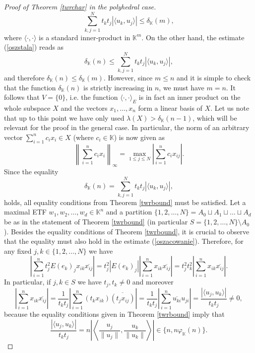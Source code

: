 \documentclass[12pt, reqno]{amsart}
\theoremstyle{definition}
\theoremstyle{remark}
\numberwithin{equation}{section}
\begin{document}
\begin{proof}[Proof of Theorem \ref{twrchar} in the polyhedral case]
$$\sum_{k, j=1}^N t_k t_j | \langle u_k,  u_j\rangle| \leq \delta_{\mathbb{K}}(m),$$
where $\langle \cdot, \cdot \rangle$ is a standard inner-product in $\mathbb{K}^m$. On the other hand, the estimate (\ref{oszstala}) reads as
$$\delta_{\mathbb{K}}(n) \leq \sum_{k, j=1}^N t_k t_j | \langle u_k,  u_j\rangle|,$$
and therefore $\delta_{\mathbb{K}}(n) \leq \delta_{\mathbb{K}}(m)$. However, since $m \leq n$ and it is simple to check that the function $\delta_{\mathbb{K}}(n)$ is strictly increasing in $n$, we must have $m=n$. It follows that $V = \{0\}$, i.e. the function $\langle \cdot, \cdot \rangle_E$ is in fact an inner product on the whole subspace $X$ and the vectors $x_1, \ldots, x_n$ form a linear basis of $X$. Let us note that up to this point we have only used $\lambda(X)>\delta_{\mathbb{K}}(n-1)$, which will be relevant for the proof in the general case. In particular, the norm of an arbitrary vector $\sum_{i=1}^{n} c_ix_i \in X$ (where $c_i \in \mathbb{K}$) is now given as
\begin{equation}
\label{norma}
\left \| \sum_{i=1}^{n} c_ix_i \right \|_{\infty} = \max_{1 \leq j \leq N} \left | \sum_{i=1}^{n} c_ix_{ij} \right |.
\end{equation}
Since the equality
$$\delta_{\mathbb{K}}(n) = \sum_{k, j=1}^N t_k t_j | \langle u_k,  u_j\rangle|,$$
holds, all equality conditions from Theorem \ref{twrbound} must be satisfied. Let a maximal ETF $w_1, w_2, \ldots, w_d \in \mathbb{K}^n$ and a partition $\{1, 2, \ldots, N\} = A_0 \sqcup A_1 \sqcup \ldots \sqcup A_d$ be as in the statement of Theorem \ref{twrbound} (in particular $S = \{1, 2, \ldots, N\} \setminus A_0 $). Besides the equality conditions of Theorem \ref{twrbound}, it is crucial to observe that the equality must also hold in the estimate (\ref{oszacowanie}). Therefore, for any fixed $j, k \in \{1, 2, \ldots, N\}$ we have
$$\left | \sum_{i=1}^{n} t_j^2 E(e_k)_jx_{ik}\overline{x_{ij}} \right | = t_j^2 |E(e_k)_j| \left | \sum_{i=1}^{n} x_{ik}\overline{x_{ij}} \right | = t_j^2 t_k^2 \left | \sum_{i=1}^{n} x_{ik}\overline{x_{ij}} \right |.$$
In particular, if $j, k \in S$ we have $t_j, t_k \neq 0$ and moreover
$$\left | \sum_{i=1}^{n} x_{ik}\overline{x_{ij}} \right | =\frac{1}{t_kt_j}\left | \sum_{i=1}^{n} (t_kx_{ik})\overline{(t_jx_{ij})} \right | = \frac{1}{t_kt_j}\left | \sum_{i=1}^{n} \overline{u_{ki}}u_{ji} \right | = \frac{| \langle u_j, u_k \rangle |}{t_kt_j} \neq 0,$$
because the equality conditions given in Theorem \ref{twrbound} imply that
 $$\frac{| \langle u_j, u_k \rangle |}{t_kt_j} = n \left | \left \langle  \frac{u_j}{\|u_j\|},  \frac{u_k}{\|u_k\|} \right \rangle \right | \in \{n, n \varphi_{\mathbb{K}}(n)\}.$$

\end{proof}
\end{document}
